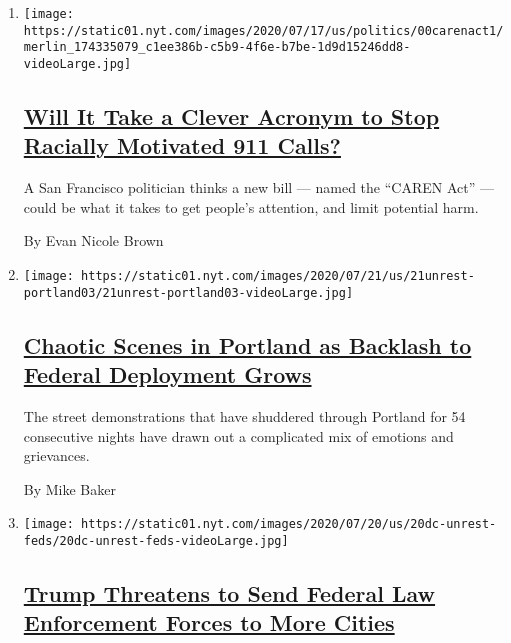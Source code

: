 \begin{enumerate}
\def\labelenumi{\arabic{enumi}.}
\item
  \texttt{[image: https://static01.nyt.com/images/2020/07/17/us/politics/00carenact1/merlin\_174335079\_c1ee386b-c5b9-4f6e-b7be-1d9d15246dd8-videoLarge.jpg]}

  \hypertarget{will-it-take-a-clever-acronym-to-stop-racially-motivated-911-calls}{%
  \subsection{\texorpdfstring{\href{/2020/07/24/briefing/caren-act-911-san-francisco.html}{Will
  It Take a Clever Acronym to Stop Racially Motivated 911
  Calls?}}{Will It Take a Clever Acronym to Stop Racially Motivated 911 Calls?}}\label{will-it-take-a-clever-acronym-to-stop-racially-motivated-911-calls}}

  A San Francisco politician thinks a new bill --- named the ``CAREN
  Act'' --- could be what it takes to get people's attention, and limit
  potential harm.

  By Evan Nicole Brown
\item
  \texttt{[image: https://static01.nyt.com/images/2020/07/21/us/21unrest-portland03/21unrest-portland03-videoLarge.jpg]}

  \hypertarget{chaotic-scenes-in-portland-as-backlash-to-federal-deployment-grows}{%
  \subsection{\texorpdfstring{\href{/2020/07/21/us/portland-protests.html}{Chaotic
  Scenes in Portland as Backlash to Federal Deployment
  Grows}}{Chaotic Scenes in Portland as Backlash to Federal Deployment Grows}}\label{chaotic-scenes-in-portland-as-backlash-to-federal-deployment-grows}}

  The street demonstrations that have shuddered through Portland for 54
  consecutive nights have drawn out a complicated mix of emotions and
  grievances.

  By Mike Baker
\item
  \texttt{[image: https://static01.nyt.com/images/2020/07/20/us/20dc-unrest-feds/20dc-unrest-feds-videoLarge.jpg]}

  \hypertarget{trump-threatens-to-send-federal-law-enforcement-forces-to-more-cities}{%
  \subsection{\texorpdfstring{\href{/2020/07/20/us/politics/trump-chicago-portland-federal-agents.html}{Trump
  Threatens to Send Federal Law Enforcement Forces to More
  Cities}}{Trump Threatens to Send Federal Law Enforcement Forces to More Cities}}\label{trump-threatens-to-send-federal-law-enforcement-forces-to-more-cities}}


\end{enumerate}
